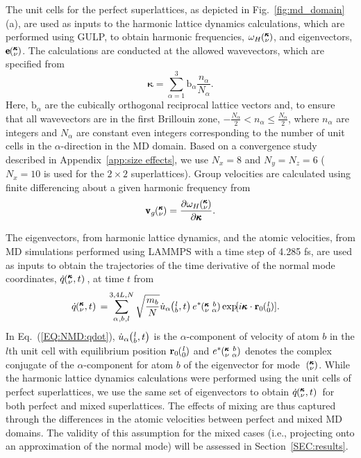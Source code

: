 \documentclass[aps,prb,preprint,preprintnumbers,amsmath,amssymb,floatfix,superscriptaddress]{revtex4}
\newcommand{\EXP}[1]{\exp\mspace{-5.0mu}\left[#1\right]\mspace{-3.0mu}}
\newcommand{\SUM}[2]{\ifthenelse{\equal{#1}{0}}{\sum_{
\alpha_{#2},b_{#2},l_{#2}}^{3,4L,N}} {\ifthenelse{\equal{#1}{1}}{\sum_{
\alpha_{#2},b_{#2}}^{3,n}}{\sum_{\pmb{\kappa}#2,\nu#2}^{N,3n}}}}
\newcommand{\ab}[2]{\mspace{-4.0mu}\left(\mspace{-8.0mu}
\begin{smallmatrix}&\ifthenelse{\equal{#1}{}}{a}{#1} \\&\ifthenelse
{\equal{#2}{}}{b}{#2}\end{smallmatrix}\mspace{-3.0mu}\right)}
\newcommand{\kvba}{\mspace{-4.0mu}\left(\mspace{-8.0mu}
\begin{smallmatrix} &\pmb{\kappa} &b \\ &\nu &\alpha\end{smallmatrix}
\mspace{-3.0mu}\right)}
\newcommand{\kvt}{\mspace{-4.0mu}\left(\mspace{-8.0mu}
\begin{smallmatrix}&\pmb{\kappa} \\&\nu\end{smallmatrix}
\mspace{-2.0mu},t\right)}
\newcommand{\kv}{\mspace{-4.0mu}\left(\mspace{-8.0mu}
\begin{smallmatrix}&\pmb{\kappa} \\&\nu\end{smallmatrix}
\mspace{-3.0mu}\right)}
\newcommand{\lbt}{\mspace{-4.0mu}\left(\mspace{-8.0mu}
\begin{smallmatrix}&l \\&b\end{smallmatrix}\mspace{-2.0mu},t\right)}
\begin{document}
The unit cells for the perfect superlattices, as depicted in Fig.~\ref{fig:md_domain}(a), are used as inputs to the harmonic lattice dynamics calculations, which are performed using GULP,\cite{GULP} to obtain harmonic frequencies, $\omega_H \kv$, and eigenvectors, $ \pmb{\mathrm{e}} \kv$. The calculations are conducted at the allowed wavevectors, which are specified from
\begin{equation}\label{EQ:NMD:allowdkpt}
\pmb{\kappa} = \sum_{\alpha=1}^3 \pmb{\mathrm{b}}_{\alpha} \frac{n_{\alpha}}{N_{\alpha}}.
\end{equation}
Here, $\pmb{\mathrm{b}}_\alpha$ are the cubically orthogonal reciprocal lattice vectors and, to ensure that all wavevectors are in the first Brillouin zone, $ -\frac{N_\alpha}{2} < n_\alpha \le \frac {N_\alpha}{2}$, where $n_\alpha$ are integers and $N_\alpha$ are constant even integers corresponding to the number of unit cells in the $\alpha$-direction in the MD domain. Based on a convergence study described in Appendix~\ref{app:size effects}, we use $N_x=8$ and $N_y=N_z=6$ ($N_x=10$ is used for the $2\times2$ superlattices). Group velocities are calculated using finite differencing about a given harmonic frequency from \cite{ziman_electrons_2001}
\begin{equation}\label{EQ:NMD:vg}
\begin{split}
\pmb{\mathrm{v}}_{g}\kv=\frac{\partial \omega_H \kv}{\partial \pmb{\kappa}}.
\end{split}
\end{equation}

The eigenvectors, from harmonic lattice dynamics, and the atomic velocities, from MD simulations performed using LAMMPS with a time step of 4.285 fs,\cite{LAMMPS} are used as inputs to obtain the trajectories of the time derivative of the normal mode coordinates, $\dot{q}\kvt{}{}{}$, at time $t$ from
\begin{equation}\label{EQ:NMD:qdot}
\begin{split}
\dot{q}\kvt{}{}{}=&\SUM{0}{}\sqrt{\frac{m_b}{N}}\dot{u}_{\alpha}\lbt e^*\kvba\EXP{i\pmb{\kappa}\cdot\mathbf{r}_0\ab{l}{0}}.
\end{split}
\end{equation}
In Eq.~(\ref{EQ:NMD:qdot}), $\dot{u}_{\alpha}\lbt$ is the $\alpha$-component of velocity of atom $b$ in the $l$th unit cell with equilibrium position $\mathbf{r}_0\ab{l}{0}$ and $e^*\kvba$ denotes the complex conjugate of the $\alpha$-component for atom $b$ of the eigenvector for mode  ~$\kv$. While the harmonic lattice dynamics calculations were performed using the unit cells of perfect superlattices, we use the same set of eigenvectors to obtain $\dot{q}\kvt{}{}{}$ for both perfect and mixed superlattices. The effects of mixing are thus captured through the differences in the atomic velocities between perfect and mixed MD domains. The validity of this assumption for the mixed cases (i.e., projecting onto an approximation of the normal mode) will be assessed in Section~\ref{SEC:results}.
\end{document}
